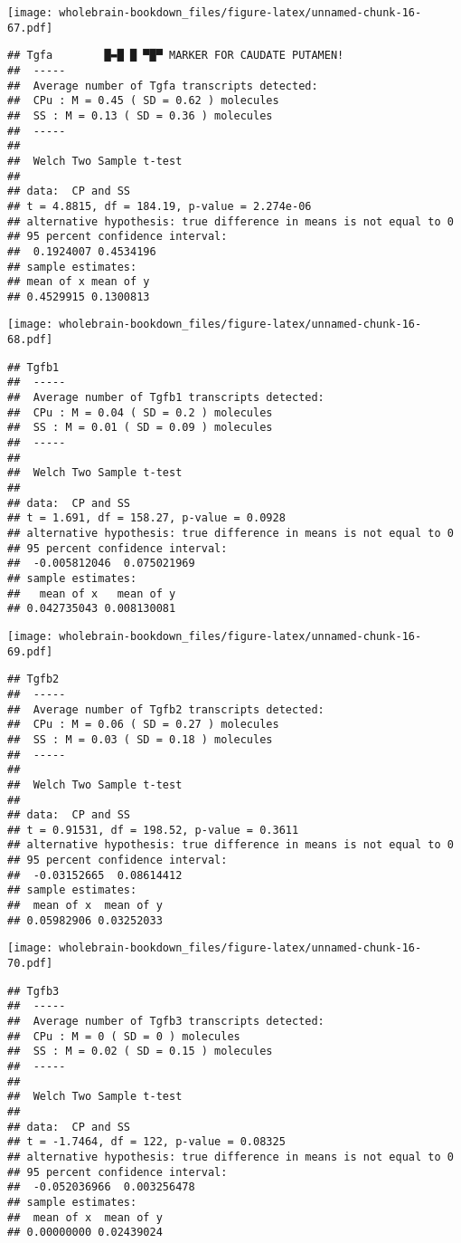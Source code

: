 \documentclass[]{book}
\theoremstyle{definition}
\theoremstyle{definition}
\theoremstyle{remark}
\begin{document}
\texttt{[image: wholebrain-bookdown\_files/figure-latex/unnamed-chunk-16-67.pdf]}

\begin{verbatim}
## Tgfa        █▬█ █ ▀█▀ MARKER FOR CAUDATE PUTAMEN!
##  -----
##  Average number of Tgfa transcripts detected:
##  CPu : M = 0.45 ( SD = 0.62 ) molecules 
##  SS : M = 0.13 ( SD = 0.36 ) molecules
##  -----
## 
##  Welch Two Sample t-test
## 
## data:  CP and SS
## t = 4.8815, df = 184.19, p-value = 2.274e-06
## alternative hypothesis: true difference in means is not equal to 0
## 95 percent confidence interval:
##  0.1924007 0.4534196
## sample estimates:
## mean of x mean of y 
## 0.4529915 0.1300813
\end{verbatim}

\texttt{[image: wholebrain-bookdown\_files/figure-latex/unnamed-chunk-16-68.pdf]}

\begin{verbatim}
## Tgfb1
##  -----
##  Average number of Tgfb1 transcripts detected:
##  CPu : M = 0.04 ( SD = 0.2 ) molecules 
##  SS : M = 0.01 ( SD = 0.09 ) molecules
##  -----
## 
##  Welch Two Sample t-test
## 
## data:  CP and SS
## t = 1.691, df = 158.27, p-value = 0.0928
## alternative hypothesis: true difference in means is not equal to 0
## 95 percent confidence interval:
##  -0.005812046  0.075021969
## sample estimates:
##   mean of x   mean of y 
## 0.042735043 0.008130081
\end{verbatim}

\texttt{[image: wholebrain-bookdown\_files/figure-latex/unnamed-chunk-16-69.pdf]}

\begin{verbatim}
## Tgfb2
##  -----
##  Average number of Tgfb2 transcripts detected:
##  CPu : M = 0.06 ( SD = 0.27 ) molecules 
##  SS : M = 0.03 ( SD = 0.18 ) molecules
##  -----
## 
##  Welch Two Sample t-test
## 
## data:  CP and SS
## t = 0.91531, df = 198.52, p-value = 0.3611
## alternative hypothesis: true difference in means is not equal to 0
## 95 percent confidence interval:
##  -0.03152665  0.08614412
## sample estimates:
##  mean of x  mean of y 
## 0.05982906 0.03252033
\end{verbatim}

\texttt{[image: wholebrain-bookdown\_files/figure-latex/unnamed-chunk-16-70.pdf]}

\begin{verbatim}
## Tgfb3
##  -----
##  Average number of Tgfb3 transcripts detected:
##  CPu : M = 0 ( SD = 0 ) molecules 
##  SS : M = 0.02 ( SD = 0.15 ) molecules
##  -----
## 
##  Welch Two Sample t-test
## 
## data:  CP and SS
## t = -1.7464, df = 122, p-value = 0.08325
## alternative hypothesis: true difference in means is not equal to 0
## 95 percent confidence interval:
##  -0.052036966  0.003256478
## sample estimates:
##  mean of x  mean of y 
## 0.00000000 0.02439024
\end{verbatim}
\end{document}
